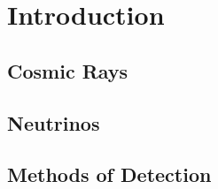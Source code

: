 \chapter{Introduction}

\label{sec:cosmic_rays}
\section{Cosmic Rays}

\label{sec:neutrinos}
\section{Neutrinos}

\label{sec:detection_methods}
\section{Methods of Detection}
